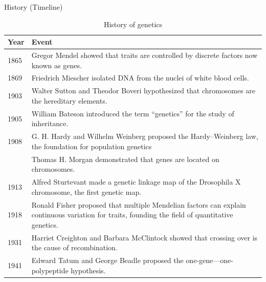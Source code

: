 \documentclass[11pt,ignorenonframetext,aspectratio=169]{beamer}
\begin{document}
\begin{frame}{History (Timeline)}
\protect\hypertarget{history-timeline}{}
\begin{table}

\caption{\label{tab:history-table1}History of genetics}
\centering
\fontsize{8}{10}\selectfont
\begin{tabular}[t]{l>{\raggedright\arraybackslash}p{40em}}
\toprule
Year & Event\\
\midrule
\rowcolor{gray!6}  1865 & Gregor Mendel showed that traits are controlled by discrete factors now known as genes.\\
1869 & Friedrich Miescher isolated DNA from the nuclei of white blood cells.\\
\rowcolor{gray!6}  1903 & Walter Sutton and Theodor Boveri hypothesized that chromosomes are the hereditary elements.\\
1905 & William Bateson introduced the term “genetics” for the study of inheritance.\\
\rowcolor{gray!6}  1908 & G. H. Hardy and Wilhelm Weinberg proposed the Hardy–Weinberg law, the foundation for population genetics\\
\addlinespace
1910 & Thomas H. Morgan demonstrated that genes are located on chromosomes.\\
\rowcolor{gray!6}  1913 & Alfred Sturtevant made a genetic linkage map of the Drosophila X chromosome, the first genetic map.\\
1918 & Ronald Fisher proposed that multiple Mendelian factors can explain continuous variation for traits, founding the field of quantitative genetics.\\
\rowcolor{gray!6}  1931 & Harriet Creighton and Barbara McClintock showed that crossing over is the cause of recombination.\\
1941 & Edward Tatum and George Beadle proposed the one-gene—one-polypeptide hypothesis.\\
\bottomrule
\end{tabular}
\end{table}
\end{frame}
\end{document}
